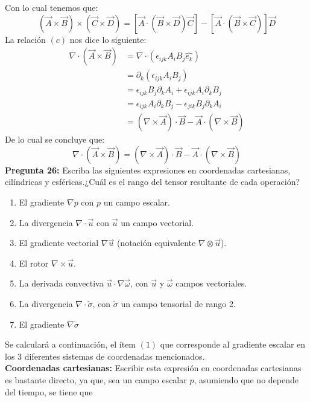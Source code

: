 \documentclass[11pt,letterpaper]{article}
\begin{document}
Con lo cual tenemos que:
\begin{equation}
    (\vec{A}\times \vec{B})\times (\vec{C}\times\vec{D}) = [\vec{A}\cdot (\vec{B} \times \vec{D})\vec{C}]- [\vec{A}\cdot (\vec{B}\times\vec{C})]\vec{D} 
\end{equation}
La relación $(c)$ nos dice lo siguiente: 
\begin{align*}
    \nabla \cdot (\vec{A}\times \vec{B})  &= \nabla \cdot (\epsilon_{ijk}A_iB_j\hat{e_k}) \\
    & = \partial_k(\epsilon_{ijk}A_iB_j) \\
    & = \epsilon_{ijk}B_j\partial_kA_i + \epsilon_{ijk}A_i\partial_kB_j \\
    & = \epsilon_{ijk}A_i\partial_kB_j - \epsilon_{jik}B_j\partial_k A_i \\
    & = (\nabla \times \vec{A})\cdot \vec{B}  - \vec{A} \cdot (\nabla \times \vec{B}) 
\end{align*}
De lo cual se concluye que:
\begin{equation}
    \nabla \cdot (\vec{A}\times \vec{B}) = (\nabla \times \vec{A})\cdot \vec{B}  - \vec{A} \cdot (\nabla \times \vec{B}) 
\end{equation}
\textbf{Pregunta 26:} Escriba las siguientes expresiones en coordenadas cartesianas, cilíndricas y esféricas.¿Cuál es el rango del tensor resultante de cada operación?
\begin{enumerate}
    \item El gradiente $\nabla p$ con $p$ un campo escalar.
    \item La divergencia $\nabla \cdot \vec{u}$ con $\vec{u}$ un campo vectorial.
    \item El gradiente vectorial $\nabla \vec{u}$ (notación equivalente $\nabla \otimes \vec{u}$).
    \item El rotor $\nabla \times \vec{u}$.
    \item La derivada convectiva $\vec{u}\cdot\nabla\vec{\omega}$, con $\vec{u}$ y $\vec{\omega}$ campos vectoriales.
    \item La divergencia $\nabla \cdot \check{\sigma}$, con $\check{\sigma}$ un campo tensorial de rango 2. 
    \item El gradiente $\nabla\check{\sigma}$
\end{enumerate}
Se calculará a continuación, el ítem $(1)$ que corresponde al gradiente escalar en los 3 diferentes sistemas de coordenadas mencionados. \\
\textbf{Coordenadas cartesianas:} Escribir esta expresión en coordenadas cartesianas es bastante directo, ya que, sea un campo escalar $p$, asumiendo que no depende del tiempo, se tiene que
\end{document}
